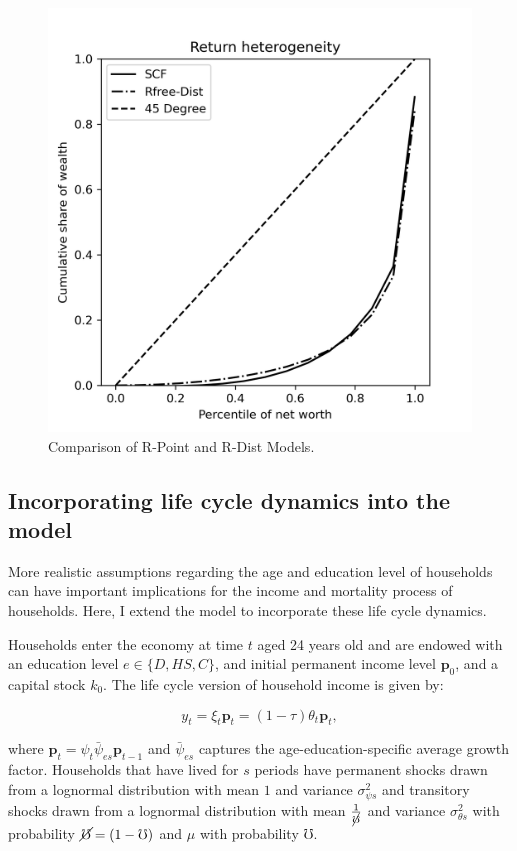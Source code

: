 \begin{figure}[h]
\begin{minipage}{0.48\textwidth}
        \includegraphics[width=\textwidth]{../Figures/PYrrDistNetWorthPlot.png}
    \end{minipage}
    \caption{Comparison of R-Point and R-Dist Models.}
    \label{fig:PYUnif} 
\end{figure}


\subsection{Incorporating life cycle dynamics into the model}

\par More realistic assumptions regarding the age and education level of households can have important implications for the income and mortality process of households. Here, I extend the model to incorporate these life cycle dynamics.

\par Households enter the economy at time $t$ aged 24 years old and are endowed with an education level $e \in \{D,HS,C\}$, and initial permanent income level $\textbf{p}_0$, and a capital stock $k_0$. The life cycle version of household income is given by:

$$ y_t = \xi_t \textbf{p}_t = (1 - \tau) \theta_t \textbf{p}_t, $$

where $\textbf{p}_t = \psi_t \bar{\psi}_{es} \textbf{p}_{t-1}$ and $\bar{\psi}_{es}$ captures the age-education-specific average growth factor. Households that have lived for $s$ periods have permanent shocks drawn from a lognormal distribution with mean $1$ and variance $\sigma^{2}_{\psi s}$ and transitory shocks drawn from a lognormal distribution with mean $\frac{1}{\cancel{\mho}}$ and variance $\sigma^{2}_{\theta s}$ with probability $\cancel{\mho} = (1-\mho)$ and $\mu$ with probability $\mho$.

